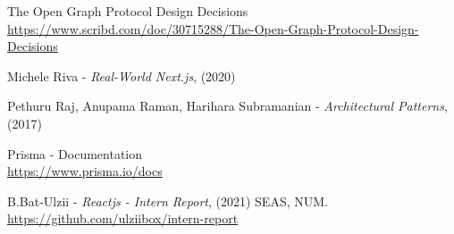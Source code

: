 \renewcommand\bibname{Ашигласан материал}
\begin{thebibliography}{99}
	The Open Graph Protocol Design Decisions
	\\\url{https://www.scribd.com/doc/30715288/The-Open-Graph-Protocol-Design-Decisions}
	
	Michele Riva - \textit{Real-World Next.js}, (2020)
	
	Pethuru Raj, Anupama Raman, Harihara Subramanian - \textit{Architectural Patterns}, (2017)

	Prisma - Documentation
	\\\url{https://www.prisma.io/docs}
	
	B.Bat-Ulzii - \textit{Reactjs - Intern Report}, (2021) SEAS, NUM. \\\url{https://github.com/ulziibox/intern-report}

\end{thebibliography}